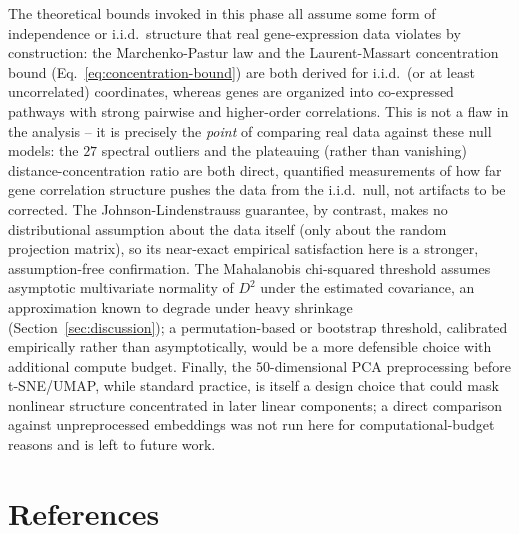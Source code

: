 \documentclass[11pt]{article}
\begin{document}
The theoretical bounds invoked in this phase all assume some form of
independence or i.i.d.\ structure that real gene-expression data violates
by construction: the Marchenko-Pastur law and the Laurent-Massart
concentration bound (Eq.~\ref{eq:concentration-bound}) are both derived
for i.i.d.\ (or at least uncorrelated) coordinates, whereas genes are
organized into co-expressed pathways with strong pairwise and higher-order
correlations. This is not a flaw in the analysis -- it is precisely the
\emph{point} of comparing real data against these null models: the
$27$ spectral outliers and the plateauing (rather than vanishing)
distance-concentration ratio are both direct, quantified measurements of
how far gene correlation structure pushes the data from the i.i.d.\ null,
not artifacts to be corrected. The Johnson-Lindenstrauss guarantee, by
contrast, makes no distributional assumption about the data itself (only
about the random projection matrix), so its near-exact empirical
satisfaction here is a stronger, assumption-free confirmation. The
Mahalanobis chi-squared threshold assumes asymptotic multivariate
normality of $D^2$ under the estimated covariance, an approximation known
to degrade under heavy shrinkage (Section~\ref{sec:discussion}); a
permutation-based or bootstrap threshold, calibrated empirically rather
than asymptotically, would be a more defensible choice with additional
compute budget. Finally, the $50$-dimensional PCA preprocessing before
t-SNE/UMAP, while standard practice, is itself a design choice that could
mask nonlinear structure concentrated in later linear components; a direct
comparison against unpreprocessed embeddings was not run here for
computational-budget reasons and is left to future work.

\section{References}
\end{document}
